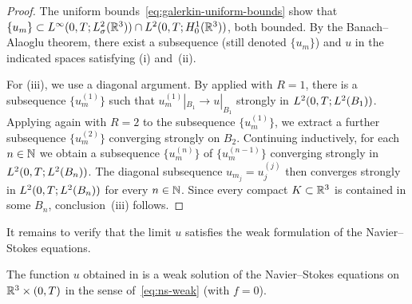 \begin{proof}
  The uniform bounds~\eqref{eq:galerkin-uniform-bounds} show that
  $\{u_{m}\} \subset L^{\infty}(0, T; L^{2}_\sigma(\mathbb{R}^{3})) \cap
  L^{2}(0, T; H^{1}_0(\mathbb{R}^{3}))$, both bounded.  By the Banach--Alaoglu theorem,
  there exist a subsequence (still denoted $\{u_{m}\}$) and $u$ in the indicated
  spaces satisfying (i) and~(ii).

  For (iii), we use a diagonal argument.  By  applied with
  $R = 1$, there is a subsequence $\{u_{m}^{(1)}\}$ such that
  $u_{m}^{(1)}|_{B_{1}} \to u|_{B_{1}}$ strongly in
  $L^{2}(0, T; L^{2}(B_{1}))$.
  Applying  again with $R = 2$ to the subsequence
  $\{u_{m}^{(1)}\}$, we extract a further subsequence $\{u_{m}^{(2)}\}$ converging
  strongly on $B_{2}$.  Continuing inductively, for each $n \in \mathbb{N}$ we obtain a
  subsequence $\{u_{m}^{(n)}\}$ of $\{u_{m}^{(n-1)}\}$ converging strongly in
  $L^{2}(0, T; L^{2}(B_{n}))$.  The diagonal subsequence
  $u_{m_{j}} = u_{j}^{(j)}$ then converges strongly in
  $L^{2}(0, T; L^{2}(B_{n}))$ for every $n \in \mathbb{N}$.  Since every compact
  $K \subset \mathbb{R}^{3}$ is contained in some $B_{n}$, conclusion~(iii) follows.
\end{proof}

It remains to verify that the limit $u$ satisfies the weak formulation of the
Navier--Stokes equations.

\begin{theorem}\label{thm:passage-limit}
  The function $u$ obtained in  is a weak solution
  of the Navier--Stokes equations on $\mathbb{R}^{3} \times (0, T)$ in the sense
  of~\eqref{eq:ns-weak} (with $f = 0$).
\end{theorem}

